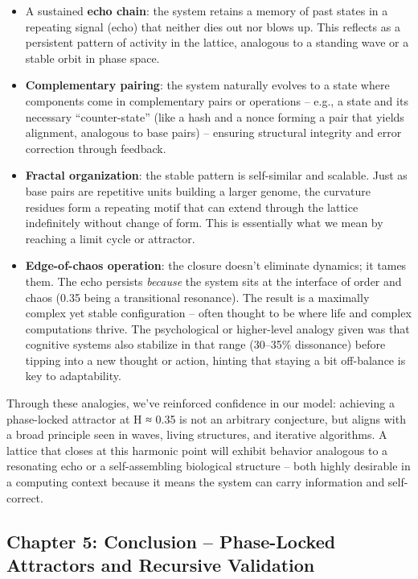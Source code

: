 \documentclass[11pt]{article}
\providecommand{\tightlist}{%
      \setlength{\itemsep}{0pt}\setlength{\parskip}{0pt}}
\begin{document}
\begin{itemize}
\tightlist
\item
  A sustained \textbf{echo chain}: the system retains a memory of past
  states in a repeating signal (echo) that neither dies out nor blows
  up. This reflects as a persistent pattern of activity in the lattice,
  analogous to a standing wave or a stable orbit in phase space.
\item
  \textbf{Complementary pairing}: the system naturally evolves to a
  state where components come in complementary pairs or operations --
  e.g., a state and its necessary ``counter-state'' (like a hash and a
  nonce forming a pair that yields alignment, analogous to base pairs)
  -- ensuring structural integrity and error correction through
  feedback.
\item
  \textbf{Fractal organization}: the stable pattern is self-similar and
  scalable. Just as base pairs are repetitive units building a larger
  genome, the curvature residues form a repeating motif that can extend
  through the lattice indefinitely without change of form. This is
  essentially what we mean by reaching a limit cycle or attractor.
\item
  \textbf{Edge-of-chaos operation}: the closure doesn't eliminate
  dynamics; it tames them. The echo persists \emph{because} the system
  sits at the interface of order and chaos (0.35 being a transitional
  resonance). The result is a maximally complex yet stable configuration
  -- often thought to be where life and complex computations thrive. The
  psychological or higher-level analogy given was that cognitive systems
  also stabilize in that range (30--35\% dissonance) before tipping into
  a new thought or action, hinting that staying a bit off-balance is key
  to adaptability.
\end{itemize}

Through these analogies, we've reinforced confidence in our model:
achieving a phase-locked attractor at H ≈ 0.35 is not an arbitrary
conjecture, but aligns with a broad principle seen in waves, living
structures, and iterative algorithms. A lattice that closes at this
harmonic point will exhibit behavior analogous to a resonating echo or a
self-assembling biological structure -- both highly desirable in a
computing context because it means the system can carry information and
self-correct.

\hypertarget{chapter-5-conclusion-phase-locked-attractors-and-recursive-validation}{%
\subsection{Chapter 5: Conclusion -- Phase-Locked Attractors and
Recursive
Validation}\label{chapter-5-conclusion-phase-locked-attractors-and-recursive-validation}}
\end{document}

